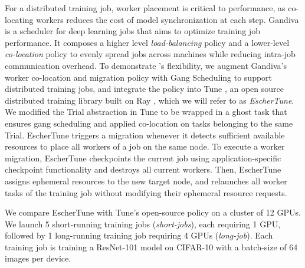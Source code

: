   
\def\longjob{\emph{long-job}}
\def\shortjobs{\emph{short-jobs}}
For a distributed training job, worker placement is critical to performance, as co-locating workers reduces the cost of model synchronization at each step.
Gandiva \cite{gandiva} is a scheduler for deep learning jobs that aims to optimize training job performance. It composes a higher level \textit{load-balancing} policy and a lower-level \textit{co-location} policy to evenly spread jobs across machines while reducing intra-job communication overhead. 
To demonstrate \name{}'s flexibility, we augment Gandiva's \cite{gandiva} worker co-location and migration policy with Gang Scheduling to support distributed training jobs, and integrate the policy into Tune \cite{liaw2018tune}, an open source distributed training library built on Ray \cite{ray}, which we will refer to as \textit{EscherTune}.
We modified the Trial abstraction in Tune to be wrapped in a ghost task that ensures gang scheduling and applied co-location on tasks belonging to the same Trial.
EscherTune triggers a migration whenever it detects sufficient available resources to place all workers of a job on the same node.
To execute a worker migration, EscherTune checkpoints the current job using application-specific checkpoint functionality and destroys all current workers. Then, EscherTune assigns ephemeral resources to the new target node, and relaunches all worker tasks of the training job without modifying their ephemeral resource requests.
 
We compare EscherTune with Tune's open-source policy on a cluster of 12 GPUs. We launch 5 short-running training jobs (\shortjobs{}), each requiring 1 GPU, followed by 1 long-running training job requiring 4 GPUs (\longjob{}).
Each training job is training a ResNet-101 model on CIFAR-10 with a batch-size of 64 images per device.

